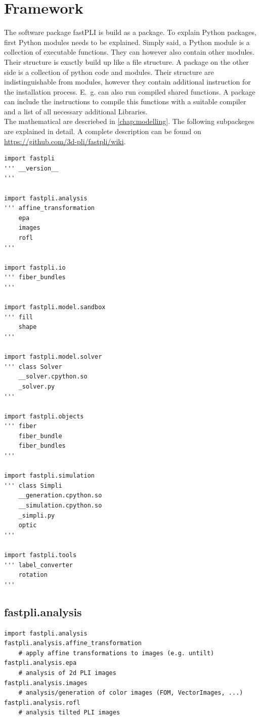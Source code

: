 \section{Framework}
The software package \ac{fastPLI} \cite{fastpli} is build as a \python{} \cite{Python3} package.
% 
To explain Python packages, first Python modules needs to be explained.
% 
Simply said, a Python module is a collection of executable functions.
They can however also contain other modules.
Their structure is exactly build up like a file structure. 
% 
A \python{} package on the other side is a collection of python code and modules.
Their structure are indistinguishable from modules, however they contain additional instruction for the installation process.
E.\ g. \python{} can also run compiled shared \ccpp{} functions.
A \python{} package can include the instructions to compile this functions with a suitable \ccpp{} compiler and a list of all necessary additional \ccpp{} Libraries.
\\
% 
The mathematical \dummy{} are descriebed in \cref{chap:modelling}.
The following subpackeges are explained in detail.
A complete description can be found on \url{https://github.com/3d-pli/fastpli/wiki}.
% 
\begin{lstfloat}[!t]
\lstset{style=python}
\begin{lstlisting}
import fastpli
''' __version__
'''

import fastpli.analysis
''' affine_transformation
    epa
    images
    rofl
'''

import fastpli.io
''' fiber_bundles
'''

import fastpli.model.sandbox
''' fill
    shape
'''

import fastpli.model.solver
''' class Solver
    __solver.cpython.so
    _solver.py
'''

import fastpli.objects
''' fiber
    fiber_bundle
    fiber_bundles
'''

import fastpli.simulation
''' class Simpli
    __generation.cpython.so
    __simulation.cpython.so
    _simpli.py
    optic
'''

import fastpli.tools
''' label_converter
    rotation
'''
\end{lstlisting}
\caption[Overview \fastpli{} package]{Overview \fastpli{} package with containing modules}
\end{lstfloat}
% 
\subsection{fastpli.analysis}
\begin{lstfloat}[!t]
\lstset{style=python}
\begin{lstlisting}
import fastpli.analysis
fastpli.analysis.affine_transformation
    # apply affine transformations to images (e.g. untilt)
fastpli.analysis.epa
    # analysis of 2d PLI images
fastpli.analysis.images
    # analysis/generation of color images (FOM, VectorImages, ...)
fastpli.analysis.rofl
    # analysis tilted PLI images
\end{lstlisting}
\caption{}
\end{lstfloat}
% 
